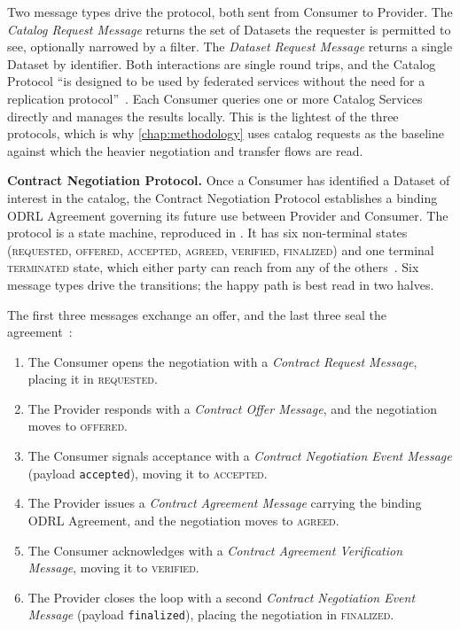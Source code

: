 Two message types drive the protocol, both sent from Consumer to Provider. The \emph{Catalog Request Message} returns the set of Datasets the requester is permitted to see, optionally narrowed by a filter. The \emph{Dataset Request Message} returns a single Dataset by identifier. Both interactions are single round trips, and the Catalog Protocol ``is designed to be used by federated services without the need for a replication protocol''~\citep{datapsaceProtocol2025}. Each Consumer queries one or more Catalog Services directly and manages the results locally. This is the lightest of the three protocols, which is why \cref{chap:methodology} uses catalog requests as the baseline against which the heavier negotiation and transfer flows are read.

\textbf{Contract Negotiation Protocol.} Once a Consumer has identified a Dataset of interest in the catalog, the Contract Negotiation Protocol establishes a binding ODRL Agreement governing its future use between Provider and Consumer. The protocol is a state machine, reproduced in . It has six non-terminal states (\textsc{requested}, \textsc{offered}, \textsc{accepted}, \textsc{agreed}, \textsc{verified}, \textsc{finalized}) and one terminal \textsc{terminated} state, which either party can reach from any of the others~\citep{datapsaceProtocol2025}. Six message types drive the transitions; the happy path is best read in two halves.

The first three messages exchange an offer, and the last three seal the agreement~\citep{datapsaceProtocol2025}:

\begin{enumerate}[leftmargin=*, itemsep=2pt, topsep=4pt]
    \item The Consumer opens the negotiation with a \emph{Contract Request Message}, placing it in \textsc{requested}.
    \item The Provider responds with a \emph{Contract Offer Message}, and the negotiation moves to \textsc{offered}.
    \item The Consumer signals acceptance with a \emph{Contract Negotiation Event Message} (payload \texttt{accepted}), moving it to \textsc{accepted}.
    \item The Provider issues a \emph{Contract Agreement Message} carrying the binding ODRL Agreement, and the negotiation moves to \textsc{agreed}.
    \item The Consumer acknowledges with a \emph{Contract Agreement Verification Message}, moving it to \textsc{verified}.
    \item The Provider closes the loop with a second \emph{Contract Negotiation Event Message} (payload \texttt{finalized}), placing the negotiation in \textsc{finalized}.
\end{enumerate}

